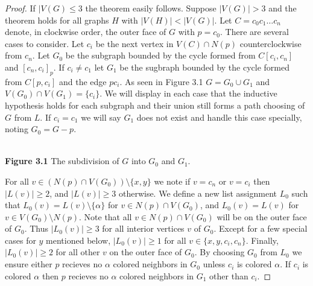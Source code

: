 \documentclass[11pt,letter]{article}
\begin{document}
\begin{proof}
If $|V(G)\le 3$ the theorem easily follows. Suppose $|V(G)|>3$ and the theorem
holds for all graphs $H$ with $|V(H)|<|V(G)|$. Let
$C=c_0c_1\ldots c_n$ denote, in clockwise order, the outer face of $G$ with $p=c_0$.
There are several cases to consider. Let $c_i$ be the next vertex in $V(C)\cap N(p)$ counterclockwise from $c_n$.
Let $G_0$ be the subgraph bounded by the cycle formed from $C[c_i,c_n]$ and $[c_n,c_i]_p$. If $c_i\ne c_1$ let
$G_1$ be the sugbraph bounded by the cycle formed from $C[p,c_i]$ and the edge $pc_i$. As seen in Figure
3.1 $G=G_0\cup G_1$ and $V(G_0)\cap V(G_1)=\{c_i\}$.
We will display in each case that the inductive hypothesis holds for each subgraph and their union still
forms a path choosing of $G$ from $L$.
If $c_i=c_1$ we will say $G_1$ does not exist and handle this case specially, noting $G_0=G-p$.

\begin{center}
\hfill\\
\textbf{Figure 3.1} The subdivision of $G$ into $G_0$ and $G_1$.
\end{center}

\noindent For all $v\in (N(p)\cap V(G_0))\setminus\{x,y\}$ we note if $v=c_n$ or $v=c_i$
then $|L(v)|\ge 2$, and $|L(v)|\ge3$ otherwise. We define a new list assignment $L_0$
such that $L_0(v)=L(v)\setminus\{\alpha\}$ for
$v\in N(p)\cap V(G_0)$, and $L_0(v)=L(v)$ for $v\in V(G_0)\setminus N(p)$. Note that all
$v\in N(p)\cap V(G_0)$ will be on the outer face of $G_0$. Thus $|L_0(v)|\ge 3$ for all interior
vertices $v$ of $G_0$. Except for a few special cases for $y$ mentioned below, $|L_0(v)|\ge 1$ for all
$v\in\{x,y,c_i,c_n\}$. Finally, $|L_0(v)|\ge2$ for all other $v$ on the outer face of $G_0$. By choosing $G_0$ from
$L_0$ we ensure either $p$ recieves no $\alpha$ colored neighbors in $G_0$ unless $c_i$ is colored $\alpha$.
If $c_i$ is colored $\alpha$ then $p$ recieves no $\alpha$ colored neighbors in $G_1$ other than $c_i$.


\end{proof}
\end{document}
